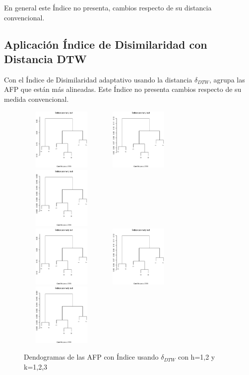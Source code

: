 En general este \'Indice no presenta, cambios respecto de su distancia convencional.

\subsection{Aplicaci\'on \'Indice de Disimilaridad con Distancia DTW}

Con el \'Indice de Disimilaridad adaptativo usando la distancia $\delta_{DTW}$, agrupa las AFP que est\'an m\'as alineadas.
Este \'Indice no presenta cambios respecto de su medida convencional.

\begin{figure}[!htp]
\centering
  \includegraphics[height=3cm, width=4cm]{i_dtw_h_1_k_1.eps}
  \includegraphics[height=3cm, width=4cm]{i_dtw_h_1_k_2.eps}
  \includegraphics[height=3cm, width=4cm]{i_dtw_h_1_k_3.eps}\\
  \includegraphics[height=3cm, width=4cm]{i_dtw_h_2_k_1.eps}
  \includegraphics[height=3cm, width=4cm]{i_dtw_h_2_k_2.eps}
  \includegraphics[height=3cm, width=4cm]{i_dtw_h_2_k_3.eps}
  \caption{Dendogramas de las AFP con \'Indice usando $\delta_{DTW}$ con h=1,2 y k=1,2,3}
\label{caja}
\end{figure}
\newpage
